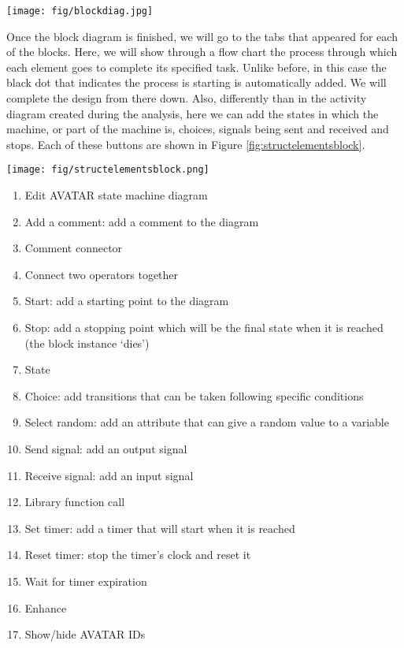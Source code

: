 \documentclass[12pt]{article}
\begin{document}
	\begin{figure*}[htbp]
\centering
\texttt{[image: fig/blockdiag.jpg]}
\caption{Block diagram} \label{fig:blockdiag}
\end{figure*}

Once the block diagram is finished, we will go to the tabs that appeared for each of the blocks. Here, we will show through a flow chart the process through which each element goes to complete its specified task. Unlike before, in this case the black dot that indicates the process is starting is automatically added. We will complete the design from there down. Also, differently than in the activity diagram created during the analysis, here we can add the states in which the machine, or part of the machine is, choices, signals being sent and received and stops. Each of these buttons are shown in Figure \ref{fig:structelementsblock}. 

\begin{figure*}[htbp]
\centering
\texttt{[image: fig/structelementsblock.png]}
\caption{Structural elements of each block diagram} \label{fig:structelementsblock}
\end{figure*}

\begin{enumerate}
\item Edit AVATAR state machine diagram
\item Add a comment: add a comment to the diagram
\item Comment connector
\item Connect two operators together
\item Start: add a starting point to the diagram
\item Stop: add a stopping point which will be the final state when it is reached (the block instance `dies')
\item State
\item Choice: add transitions that can be taken following specific conditions
\item Select random: add an attribute that can give a random value to a variable
\item Send signal: add an output signal
\item Receive signal: add an input signal
\item Library function call
\item Set timer: add a timer that will start when it is reached
\item Reset timer: stop the timer's clock and reset it
\item Wait for timer expiration
\item Enhance
\item Show/hide AVATAR IDs
\end{enumerate}
\end{document}
